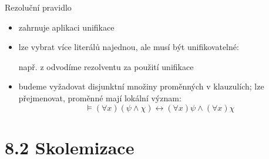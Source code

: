 \documentclass{beamer}
\begin{document}
\begin{frame}{Rezoluční pravidlo}
    
    \begin{itemize}[<+->]

        \item zahrnuje aplikaci unifikace
        \item lze vybrat \alert{více literálů najednou}, ale musí být unifikovatelné:
        
        \bigskip

        např. z  odvodíme rezolventu  za použití \alert{unifikace} 

        \medskip


        \bigskip

        \item budeme vyžadovat disjunktní množiny proměnných v klauzulích; lze přejmenovat, proměnné mají \alert{lokální význam}:
        $$
        \models(\forall x)(\psi \land \chi) \leftrightarrow (\forall x)\psi \land (\forall x)\chi
        $$
        
    \end{itemize}

\end{frame}


\section{8.2 Skolemizace}
\end{document}
